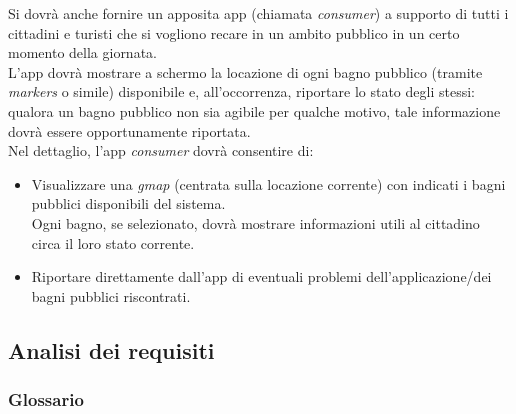 \documentclass[12pt]{article}
\begin{document}
Si dovrà anche fornire un apposita app (chiamata \textit{consumer}) a supporto di tutti i cittadini e turisti che si vogliono recare in un ambito pubblico in un certo momento della giornata.\\
L'app dovrà mostrare a schermo la locazione di ogni bagno pubblico (tramite \textit{markers} o simile) disponibile e, all'occorrenza, riportare lo stato degli stessi: qualora un bagno pubblico non sia agibile per qualche motivo, tale informazione dovrà essere opportunamente riportata.\\
Nel dettaglio, l'app \textit{consumer} dovrà consentire di:
\begin{itemize}
\item Visualizzare una \textit{gmap} (centrata sulla locazione corrente) con indicati i bagni pubblici disponibili del sistema.\\Ogni bagno, se selezionato, dovrà mostrare informazioni utili al cittadino circa il loro stato corrente.
\item Riportare direttamente dall'app di eventuali problemi dell'applicazione/dei bagni pubblici riscontrati.
\end{itemize}
\newpage
\subsection{Analisi dei requisiti}
\subsubsection{Glossario}
\end{document}
